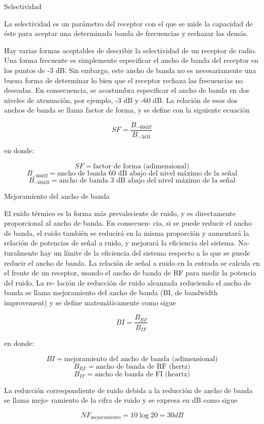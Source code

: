 \begin{frame}{Selectividad}
\protect\hypertarget{selectividad}{}

La selectividad es un parámetro del receptor con el que se mide la
capacidad de éste para aceptar una determinada banda de frecuencias y
rechazar las demás.

Hay varias formas aceptables de describir la selectividad de un receptor
de radio. Una forma frecuente es simplemente especificar el ancho de
banda del receptor en los puntos de -3 dB. Sin embargo, este ancho de
banda no es necesariamente una buena forma de determinar lo bien que el
receptor rechaza las frecuencias no deseadas. En consecuencia, se
acostumbra especificar el ancho de banda en dos niveles de atenuación,
por ejemplo, -3 dB y -60 dB. La relación de esos dos anchos de banda se
llama factor de forma, y se define con la siguiente ecuación

\[ SF = \frac{B_{-60dB}}{{B_{-3dB}}} \]

en donde:

\[ SF = \text{factor de forma (adimensional)} \]
\[ B_{-60dB} = \text{ancho de banda 60 dB abajo del nivel máximo de la señal} \]
\[ B_{-60dB} = \text{ancho de banda 3 dB abajo del nivel máximo de la señal} \]

\end{frame}

\begin{frame}{Mejoramiento del ancho de banda}
\protect\hypertarget{mejoramiento-del-ancho-de-banda}{}

El ruido térmico es la forma más prevaleciente de ruido, y es
directamente proporcional al ancho de banda. En consecuen- cia, si se
puede reducir el ancho de banda, el ruido también se reducirá en la
misma proporción y aumentará la relación de potencias de señal a ruido,
y mejorará la eficiencia del sistema. Na- turalmente hay un límite de la
eficiencia del sistema respecto a lo que se puede reducir el ancho de
banda. La relación de señal a ruido en la entrada se calcula en el
frente de un receptor, usando el ancho de banda de RF para medir la
potencia del ruido. La re- lación de reducción de ruido alcanzada
reduciendo el ancho de banda se llama mejoramiento del ancho de banda
(BI, de bandwidth improvement) y se define matemáticamente como sigue

\[BI = \frac{B_{RF}}{B_{IF}}\]

en donde:

\[BI = \text{mejoramiento del ancho de banda (adimensional)}\]
\[B_{RF} = \text{ancho de banda de RF (hertz)}\]
\[B_{IF} = \text{ancho de banda de FI (heartz)}\]

La reducción correspondiente de ruido debida a la reducción de ancho de
banda se llama mejo- ramiento de la cifra de ruido y se expresa en dB
como sigue

\[NF_{ \text{mejoramiento}} = 10 \log 20 = 30 dB\]

\end{frame}

